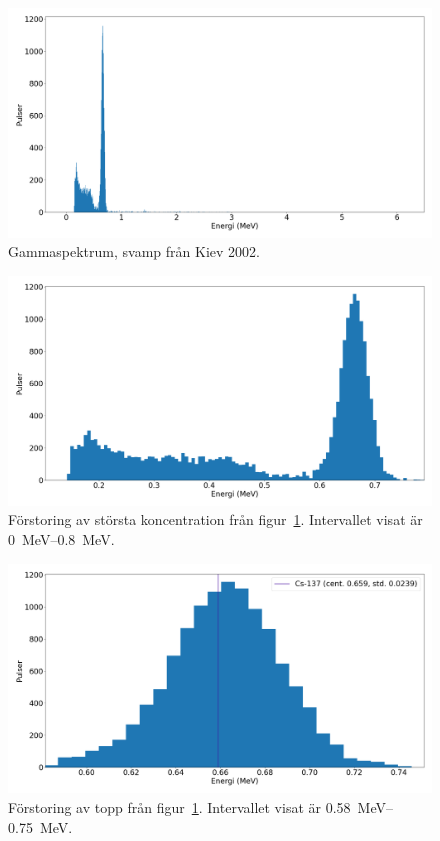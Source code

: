 \begin{figure}[htp]
    \centering
    \includegraphics[width=\textwidth, keepaspectratio]{../images/mushrooms.png}
    \caption{Gammaspektrum, svamp från Kiev 2002.}
    \label{fig:mushrooms}
\end{figure}

\begin{figure}[htp]
    \centering
    \includegraphics[width=\textwidth, keepaspectratio]{../images/mushrooms_zoom.png}
    \caption{
        Förstoring av största koncentration från figur~\ref{fig:mushrooms}.
        Intervallet visat är \qtyrange{0}{0.8}{\MeV}.
    }
    \label{fig:mushroomszoom}
\end{figure}

\begin{figure}[htp]
    \centering
    \includegraphics[width=\textwidth, keepaspectratio]{../images/mushrooms_top.png}
    \caption{
        Förstoring av topp från figur~\ref{fig:mushrooms}.
        Intervallet visat är \qtyrange{0.58}{0.75}{\MeV}.
    }
    \label{fig:mushroomstop}
\end{figure}

